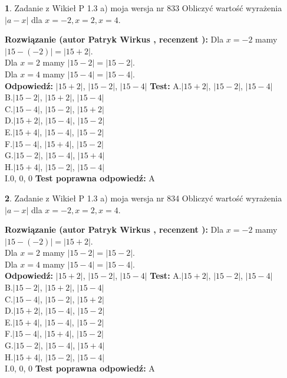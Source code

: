 \documentclass[12pt, a4paper]{article}
\theoremstyle{definition} %
\newtheorem{zad}{}
\newcommand{\zadStart}[1]{\begin{zad}#1\newline}
\newcommand{\zadStop}{\end{zad}}
\newcommand{\rozwStart}[2]{\noindent \textbf{Rozwiązanie (autor #1 , recenzent #2): }\newline}
\newcommand{\rozwStop}{\newline}
\newcommand{\odpStart}{\noindent \textbf{Odpowiedź:}\newline}
\newcommand{\odpStop}{\newline}
\newcommand{\testStart}{\noindent \textbf{Test:}\newline}
\newcommand{\testStop}{\newline}
\newcommand{\kluczStart}{\noindent \textbf{Test poprawna odpowiedź:}\newline}
\newcommand{\kluczStop}{\newline}
\begin{document}
\zadStart{Zadanie z Wikieł P 1.3 a) moja wersja nr 833}
Obliczyć wartość wyrażenia $|a - x|$ dla $x=-2,x=2,x=4$.
\zadStop
\rozwStart{Patryk Wirkus}{}
Dla $x = -2$ mamy $|15 - (-2)| = |15 + 2|$.\\
Dla $x = 2$ mamy $|15 - 2| = |15 - 2|$.\\
Dla $x = 4$ mamy $|15 - 4| = |15 - 4|$.\\
\rozwStop
\odpStart
$|15 + 2|$, $|15 - 2|$, $|15 - 4|$
\odpStop
\testStart
A.$|15 + 2|$, $|15 - 2|$, $|15 - 4|$\\
B.$|15 - 2|$, $|15 + 2|$, $|15 - 4|$\\
C.$|15 - 4|$, $|15 - 2|$, $|15 + 2|$\\
D.$|15 + 2|$, $|15 - 4|$, $|15 - 2|$\\
E.$|15 + 4|$, $|15 - 4|$, $|15 - 2|$\\
F.$|15 - 4|$, $|15 + 4|$, $|15 - 2|$\\
G.$|15 - 2|$, $|15 - 4|$, $|15 + 4|$\\
H.$|15 + 4|$, $|15 - 2|$, $|15 - 4|$\\
I.$0$, $0$, $0$
\testStop
\kluczStart
A
\kluczStop



\zadStart{Zadanie z Wikieł P 1.3 a) moja wersja nr 834}
Obliczyć wartość wyrażenia $|a - x|$ dla $x=-2,x=2,x=4$.
\zadStop
\rozwStart{Patryk Wirkus}{}
Dla $x = -2$ mamy $|15 - (-2)| = |15 + 2|$.\\
Dla $x = 2$ mamy $|15 - 2| = |15 - 2|$.\\
Dla $x = 4$ mamy $|15 - 4| = |15 - 4|$.\\
\rozwStop
\odpStart
$|15 + 2|$, $|15 - 2|$, $|15 - 4|$
\odpStop
\testStart
A.$|15 + 2|$, $|15 - 2|$, $|15 - 4|$\\
B.$|15 - 2|$, $|15 + 2|$, $|15 - 4|$\\
C.$|15 - 4|$, $|15 - 2|$, $|15 + 2|$\\
D.$|15 + 2|$, $|15 - 4|$, $|15 - 2|$\\
E.$|15 + 4|$, $|15 - 4|$, $|15 - 2|$\\
F.$|15 - 4|$, $|15 + 4|$, $|15 - 2|$\\
G.$|15 - 2|$, $|15 - 4|$, $|15 + 4|$\\
H.$|15 + 4|$, $|15 - 2|$, $|15 - 4|$\\
I.$0$, $0$, $0$
\testStop
\kluczStart
A
\kluczStop
\end{document}
